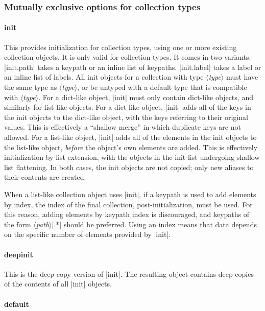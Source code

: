 \documentclass[11pt]{article}
\newcommand{\vmeta}[1]{{\color{DarkRed}\ensuremath{\langle}\textit{#1}\ensuremath{\rangle}}}
\begin{document}
{{\subsubsection{Mutually exclusive options for collection types}

\paragraph{init}

This provides initialization for collection types, using one or more existing collection objects.  It is only valid for collection types.  It comes in two variants. |init.path| takes a keypath or an inline list of keypaths.  |init.label| takes a label or an inline list of labels.  All init objects for a collection with type \vmeta{type} must have the same type as \vmeta{type}, or be untyped with a default type that is compatible with \vmeta{type}.  For a dict-like object, |init| must only contain dict-like objects, and similarly for list-like objects.  For a dict-like object, |init| adds all of the keys in the init objects to the dict-like object, with the keys referring to their original values.  This is effectively a ``shallow merge'' in which duplicate keys are not allowed.  For a list-like object, |init| adds all of the elements in the init objects to the list-like object, \emph{before} the object's own elements are added.  This is effectively initialization by list extension, with the objects in the init list undergoing shallow list flattening.  In both cases, the init objects are not copied; only new aliases to their contents are created.

When a list-like collection object uses |init|, if a keypath is used to add elements by index, the index of the final collection, post-initialization, must be used.  For this reason, adding elements by keypath index is discouraged, and keypaths of the form \vmeta{path}|.*| should be preferred.  Using an index means that data depends on the specific number of elements provided by |init|.


\paragraph{deepinit}

This is the deep copy version of |init|.  The resulting object contains deep copies of the contents of all |init| objects.


\paragraph{default}

}}
\end{document}
